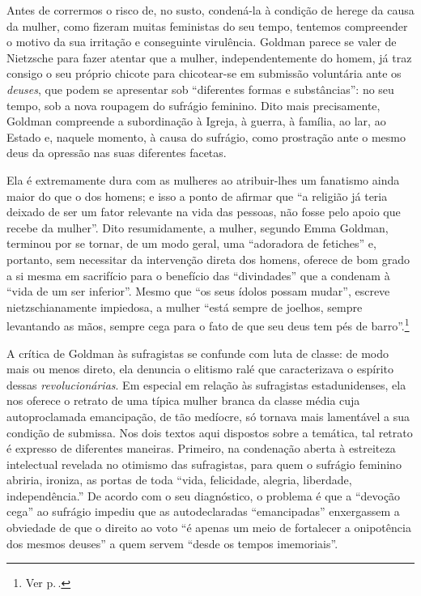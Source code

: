 Antes de corrermos o risco de, no susto,
condená-la à condição de herege da causa da mulher, como
fizeram muitas feministas do seu tempo, tentemos
compreender o motivo da sua irritação e conseguinte virulência.
Goldman parece se valer de Nietzsche para fazer atentar que a mulher,
independentemente do homem, já traz consigo o seu próprio chicote para
chicotear-se em submissão voluntária ante os \textit{deuses}, que podem se
apresentar sob ``diferentes formas e substâncias'': no seu
tempo, sob a nova roupagem do sufrágio feminino. Dito mais precisamente,
Goldman compreende a subordinação à Igreja, à guerra, à família, ao lar,
ao Estado e, naquele momento, à causa do sufrágio, como prostração ante
o mesmo deus da opressão nas suas diferentes facetas.

Ela é extremamente
dura com as mulheres ao atribuir-lhes um fanatismo ainda maior do que o
dos homens; e isso a ponto de afirmar que ``a religião já teria deixado
de ser um fator relevante na vida das pessoas, não fosse pelo apoio que
recebe da mulher''. Dito resumidamente, a mulher, segundo Emma Goldman,
terminou por se tornar, de um modo geral, uma ``adoradora de fetiches''
e, portanto, sem necessitar da intervenção direta dos homens, oferece
de bom grado a si mesma em sacrifício para o benefício das
``divindades'' que a condenam à ``vida de um ser inferior''. Mesmo que
``os seus ídolos possam mudar'', escreve nietzschianamente impiedosa,
a mulher ``está sempre de joelhos, sempre levantando as mãos, sempre
cega para o fato de que seu deus tem pés de barro''.\footnote{Ver p.\,\pageref{barro}.}



A crítica de Goldman às sufragistas se confunde com luta de classe: de
modo mais ou menos direto, ela denuncia o elitismo ralé que
caracterizava o espírito dessas \textit{revolucionárias}. Em especial
em relação às sufragistas estadunidenses, ela nos oferece o
retrato de uma típica mulher branca da classe média cuja autoproclamada
emancipação, de tão medíocre, só tornava mais lamentável a sua condição
de submissa. Nos dois textos aqui dispostos sobre a temática, tal
retrato é expresso de diferentes maneiras. Primeiro, na condenação
aberta à estreiteza intelectual revelada no otimismo das sufragistas,
para quem o sufrágio feminino abriria, ironiza, as portas de toda
``vida, felicidade, alegria, liberdade, independência.'' De acordo com o
seu diagnóstico, o problema é que a ``devoção cega'' ao sufrágio impediu
que as autodeclaradas ``emancipadas'' enxergassem a obviedade de que o
direito ao voto ``é apenas um meio de fortalecer a onipotência dos
mesmos deuses'' a quem servem ``desde os tempos imemoriais''.


